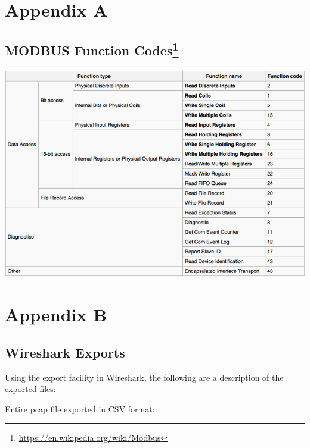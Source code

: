 \documentclass[11pt,a4paper]{article}
\let\rmarkdownfootnote\footnote%
\def\footnote{\protect\rmarkdownfootnote}
\begin{document}
\clearpage

\section*{Appendix A}\label{appendix-a}

\subsection*{MODBUS Function Codes\footnote{\url{https://en.wikipedia.org/wiki/Modbus}}}\label{modbus-function-codes4}

\begin{center}\includegraphics{thesis_files/figure-latex/unnamed-chunk-42-1} \end{center}

\clearpage

\section*{Appendix B}\label{appendix-b}

\subsection*{Wireshark Exports}\label{wireshark-exports}

Using the export facility in Wireshark, the following are a description
of the exported files:

Entire pcap file exported in CSV format:
\end{document}
